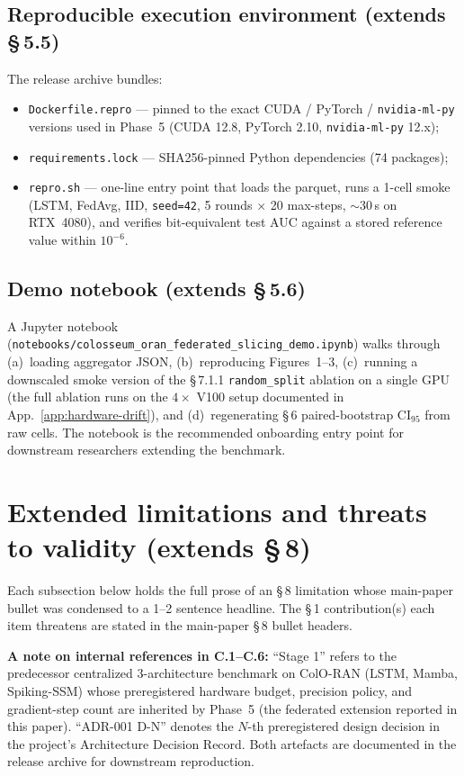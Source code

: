 \documentclass[journal]{IEEEtran}
\begin{document}
\subsection{Reproducible execution environment (extends \S\,5.5)}

The release archive bundles:

\begin{itemize}
  \item \lstinline|Dockerfile.repro| --- pinned to the exact CUDA / PyTorch / \lstinline|nvidia-ml-py| versions used in Phase~5 (CUDA 12.8, PyTorch 2.10, \lstinline|nvidia-ml-py| 12.x);
  \item \lstinline|requirements.lock| --- SHA256-pinned Python dependencies (74 packages);
  \item \lstinline|repro.sh| --- one-line entry point that loads the parquet, runs a 1-cell smoke (LSTM, FedAvg, IID, \lstinline|seed=42|, 5 rounds $\times$ 20 max-steps, $\sim 30$\,s on RTX~4080), and verifies bit-equivalent test AUC against a stored reference value within $10^{-6}$.
\end{itemize}

\subsection{Demo notebook (extends \S\,5.6)}

A Jupyter notebook (\lstinline|notebooks/colosseum_oran_federated_slicing_demo.ipynb|) walks through (a)~loading aggregator JSON, (b)~reproducing Figures~1--3, (c)~running a downscaled smoke version of the \S\,7.1.1 \lstinline|random_split| ablation on a single GPU (the full ablation runs on the $4\times$ V100 setup documented in App.~\ref{app:hardware-drift}), and (d)~regenerating \S\,6 paired-bootstrap CI$_{95}$ from raw cells. The notebook is the recommended onboarding entry point for downstream researchers extending the benchmark.


\section{Extended limitations and threats to validity (extends \S\,8)}\label{app:limits}

Each subsection below holds the full prose of an \S\,8 limitation whose main-paper bullet was condensed to a 1--2 sentence headline. The \S\,1 contribution(s) each item threatens are stated in the main-paper \S\,8 bullet headers.

\textbf{A note on internal references in C.1--C.6:} ``Stage 1'' refers to the predecessor centralized 3-architecture benchmark on ColO-RAN (LSTM, Mamba, Spiking-SSM) whose preregistered hardware budget, precision policy, and gradient-step count are inherited by Phase~5 (the federated extension reported in this paper). ``ADR-001 D-N'' denotes the $N$-th preregistered design decision in the project's Architecture Decision Record. Both artefacts are documented in the release archive for downstream reproduction.
\end{document}
